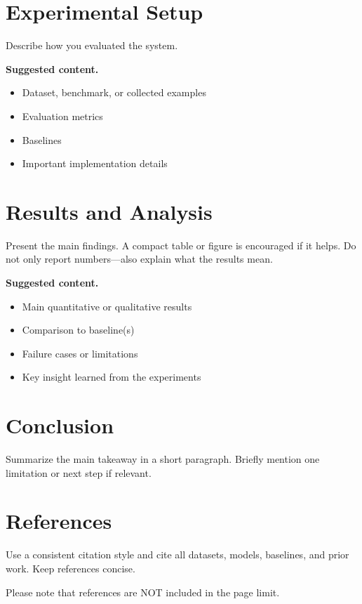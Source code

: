 \documentclass{article}
\begin{document}
\section{Experimental Setup}
Describe how you evaluated the system.

\textbf{Suggested content.}
\begin{itemize}
    \item Dataset, benchmark, or collected examples
    \item Evaluation metrics
    \item Baselines
    \item Important implementation details
\end{itemize}

\section{Results and Analysis}
Present the main findings. A compact table or figure is encouraged if it helps.
Do not only report numbers---also explain what the results mean.

\textbf{Suggested content.}
\begin{itemize}
    \item Main quantitative or qualitative results
    \item Comparison to baseline(s)
    \item Failure cases or limitations
    \item Key insight learned from the experiments
\end{itemize}

\section{Conclusion}
Summarize the main takeaway in a short paragraph. Briefly mention one limitation or
next step if relevant.

\section*{References}
Use a consistent citation style and cite all datasets, models, baselines, and prior work.
Keep references concise.

Please note that references are NOT included in the page limit.


\newpage
\end{document}
